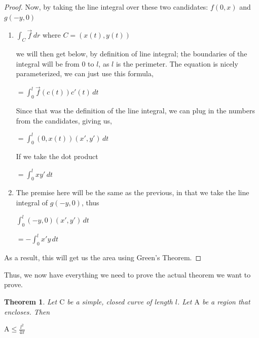 \documentclass[a4paper]{book}
\newtheorem{theorem}{Theorem}%
\numberwithin{theorem}{section}%
\begin{document}
\begin{proof}
	Now, by taking the line integral over these two candidates: $f(0,x)$ and $g(-y,0)$
	\begin{enumerate}
		\item
			$\int_{C} \overrightarrow{f} \,dr$ \;\;\;where\; $C=(x(t),y(t))$

            we will then get below, by definition of line integral; the boundaries of the integral will be from $0$ to $l$, as $l$ is the perimeter. The equation is nicely parameterized, we can just use this formula,
            \begin{center}
                $\displaystyle =\int_{0}^{l} \overrightarrow{f}(c(t))c'(t) \,dt$
            \end{center}

            Since that was the definition of the line integral, we can plug in the numbers from the candidates, giving us,
            \begin{center}
                $\displaystyle = \int_{0}^{l} (0,x(t))(x',y') \,dt$
            \end{center}

            If we take the dot product
			\begin{center}
                $\displaystyle = \int_{0}^{l} xy' \,dt$
            \end{center}
			
		\item
            The premise here will be the same as the previous, in that we take the line integral of $g(-y,0)$, thus
            \begin{center}
                $\displaystyle \int_{0}^{l} (-y,0)(x',y') \,dt$

                $\displaystyle =-\int_{0}^{l} x'y \,dt$
            \end{center}
	\end{enumerate}
    As a result, this will get us the area using Green's Theorem. 
\end{proof}
Thus, we now have everything we need to prove the actual theorem we want to prove.
\newpage
\begin{theorem}
    Let $\mathrm{C}$ be a simple, closed curve of length $l$. Let $\mathrm{A}$ be a region that encloses. Then
    \begin{center}
        $\displaystyle \mathrm{A}\leq\frac{l^2}{4\pi}$
    \end{center}
\end{theorem}
\end{document}
